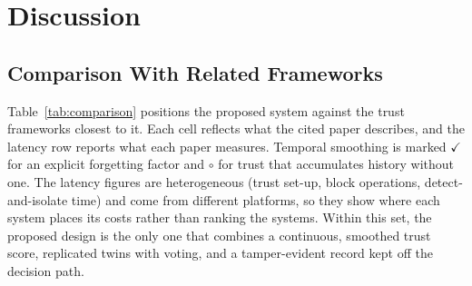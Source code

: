\section{Discussion}
\label{sec:discussion}

\subsection{Comparison With Related Frameworks}
\label{sec:res-comparison}
Table~\ref{tab:comparison} positions the proposed system against the
trust frameworks closest to it.  Each cell reflects what the cited
paper describes, and the latency row reports what each paper measures.
Temporal smoothing is marked $\checkmark$ for an explicit forgetting
factor and $\circ$ for trust that accumulates history without one.
The latency figures are heterogeneous (trust set-up, block operations,
detect-and-isolate time) and come from different platforms, so they
show where each system places its costs rather than ranking the
systems.  Within this set, the proposed design is the only one that
combines a continuous, smoothed trust score, replicated twins with
voting, and a tamper-evident record kept off the decision path.

